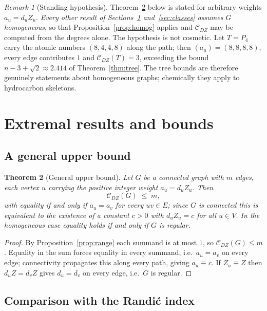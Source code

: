 \documentclass[11pt,a4paper]{article}
\theoremstyle{plain}
\newtheorem{theorem}{Theorem}[section]
\theoremstyle{definition}
\theoremstyle{remark}
\newtheorem{remark}[theorem]{Remark}
\newcommand{\CDZ}{\mathcal{C}_{DZ}}
\begin{document}
\begin{remark}[Standing hypothesis]
\label{rem:standing}
Theorem~\ref{thm:general} below is stated for arbitrary weights $a_u=d_uZ_u$.
\emph{Every other result of Sections~\ref{sec:bounds} and~\ref{sec:classes}
assumes $G$ homogeneous}, so that Proposition~\ref{prop:homog} applies and
$\CDZ$ may be computed from the degrees alone. The hypothesis is not cosmetic.
Let $T=P_4$ carry the atomic numbers $(8,4,4,8)$ along the path; then
$(a_u)=(8,8,8,8)$, every edge contributes $1$ and $\CDZ(T)=3$, exceeding the
bound $n-3+\sqrt2\approx2.414$ of Theorem~\ref{thm:tree}. The tree bounds are
therefore genuinely statements about homogeneous graphs; chemically they apply
to hydrocarbon skeletons.
\end{remark}

\section{Extremal results and bounds}
\label{sec:bounds}

\subsection{A general upper bound}

\begin{theorem}[General upper bound]
\label{thm:general}
Let $G$ be a connected graph with $m$ edges, each vertex $u$ carrying the
positive integer weight $a_u=d_uZ_u$. Then
\[
  \CDZ(G)\;\le\; m,
\]
with equality if and only if $a_u=a_v$ for every $uv\in E$; since $G$ is
connected this is equivalent to the existence of a constant $c>0$ with
$d_uZ_u=c$ for all $u\in V$. In the homogeneous case equality holds if and only
if $G$ is regular.
\end{theorem}

\begin{proof}
By Proposition~\ref{prop:range} each summand is at most $1$, so
$\CDZ(G)\le m$. Equality in the sum forces equality in every summand, i.e.\
$a_u=a_v$ on every edge; connectivity propagates this along every path, giving
$a_u\equiv c$. If $Z_u\equiv Z$ then $d_uZ=d_vZ$ gives $d_u=d_v$ on every edge,
i.e.\ $G$ is regular.
\end{proof}

\subsection{Comparison with the Randi\'c index}
\end{document}
